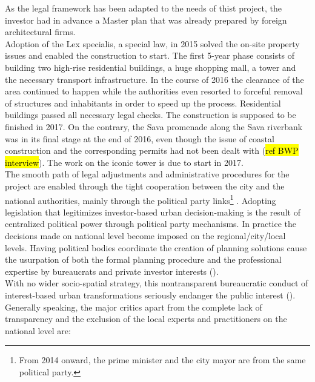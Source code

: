 \documentclass[11pt]{report}
\begin{document}
\begin{itemize}
As the legal framework has been adapted to the needs of thist project, the investor had in advance a Master plan that was already prepared by foreign architectural firms.
\\
Adoption of the Lex specialis, a special law, in 2015 solved the on-site property issues and enabled the construction to start.
The first 5-year phase consists of building two high-rise residential buildings, a huge shopping mall, a tower and the necessary transport infrastructure. 
In the course of 2016 the clearance of the area continued to happen while the authorities even resorted to forceful removal of structures and inhabitants in order to speed up the process.
Residential buildings passed all necessary legal checks. The construction is supposed to be finished in 2017.
On the contrary, the Sava promenade along the Sava riverbank was in its final stage at the end of 2016, even though the issue of coastal construction and the corresponding permits had not been dealt with (\hl{ref BWP interview}).
The work on the iconic tower is due to start in 2017.
\\
The smooth path of legal adjustments and administrative procedures for the project are enabled through the tight cooperation between the city and the national authorities, mainly through the political party links\footnote{From 2014 onward, the prime minister and the city mayor are from the same political party.}
\cite{Maruna 2015, Peric 2016}.
Adopting legislation that legitimizes investor-based urban decision-making is the result of centralized political power through political party mechanisms.
In practice the decisions made on national level become imposed on the regional/city/local levels.
Having political bodies coordinate the creation of planning solutions cause the usurpation of both the formal planning procedure and the professional expertise by bureaucrats and private investor interests (\cite{Maruna 2015, Peric 2016}).
\\
With no wider socio-spatial strategy, this nontransparent bureaucratic conduct of interest-based urban transformations seriously endanger the public interest (\cite{Vukmirovic in Doytchinov et al 2015}). 
Generally speaking, the major critics apart from the complete lack of transparency and the exclusion of the local experts and practitioners on the national level are:


\end{itemize}
\end{document}

